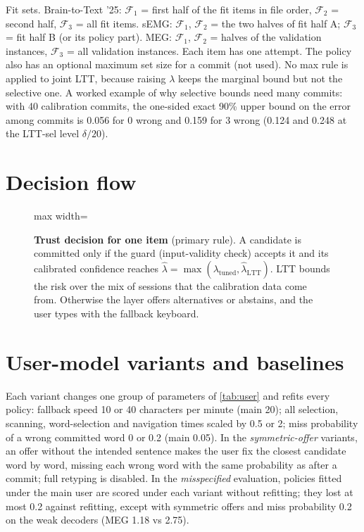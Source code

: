 \noindent Fit sets. Brain-to-Text '25: $\mathcal{F}_1$ = first half of the fit items in file order, $\mathcal{F}_2$ = second half, $\mathcal{F}_3$ = all fit items. sEMG: $\mathcal{F}_1$, $\mathcal{F}_2$ = the two halves of fit half A; $\mathcal{F}_3$ = fit half B (or its policy part). MEG: $\mathcal{F}_1$, $\mathcal{F}_2$ = halves of the validation instances, $\mathcal{F}_3$ = all validation instances. Each item has one attempt. The policy also has an optional maximum set size for a commit (not used). No max rule is applied to joint LTT, because raising $\lambda$ keeps the marginal bound but not the selective one. A worked example of why selective bounds need many commits: with 40 calibration commits, the one-sided exact 90\% upper bound on the error among commits is 0.056 for 0 wrong and 0.159 for 3 wrong (0.124 and 0.248 at the LTT-sel level $\delta/20$).

\section{Decision flow}
\label{app:decision}

\begin{figure}[H]
  \centering
  \begin{adjustbox}{max width=\linewidth}\end{adjustbox}
  \caption{\textbf{Trust decision for one item} (primary rule). A candidate is committed only if the guard (input-validity check) accepts it and its calibrated confidence reaches $\hat\lambda = \max(\lambda_{\mathrm{tuned}}, \hat\lambda_{\mathrm{LTT}})$. LTT bounds the risk over the mix of sessions that the calibration data come from. Otherwise the layer offers alternatives or abstains, and the user types with the fallback keyboard.}
  \label{fig:decision}
\end{figure}

\section{User-model variants and baselines}
\label{app:user}

Each variant changes one group of parameters of \cref{tab:user} and refits every policy: fallback speed 10 or 40 characters per minute (main 20); all selection, scanning, word-selection and navigation times scaled by 0.5 or 2; miss probability of a wrong committed word 0 or 0.2 (main 0.05). In the \emph{symmetric-offer} variants, an offer without the intended sentence makes the user fix the closest candidate word by word, missing each wrong word with the same probability as after a commit; full retyping is disabled. In the \emph{misspecified} evaluation, policies fitted under the main user are scored under each variant without refitting; they lost at most 0.2 \ewpm{} against refitting, except with symmetric offers and miss probability 0.2 on the weak decoders (MEG 1.18 vs 2.75).

